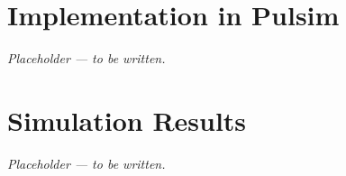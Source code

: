 \documentclass[conference, a4paper]{IEEEtran}
\begin{document}
\section{Implementation in Pulsim}
\label{sec:pulsim}


\textit{Placeholder — to be written.}

\section{Simulation Results}
\label{sec:results}


\textit{Placeholder — to be written.}

\end{document}
